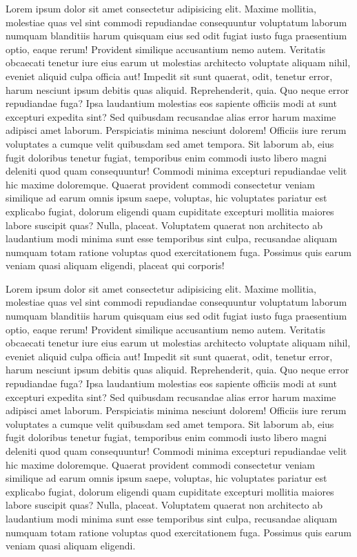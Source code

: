 \documentclass[autowc]{CUP-JNL-PPS}
\begin{document}
Lorem ipsum dolor sit amet consectetur adipisicing elit. Maxime mollitia,
molestiae quas vel sint commodi repudiandae consequuntur voluptatum laborum
numquam blanditiis harum quisquam eius sed odit fugiat iusto fuga praesentium
optio, eaque rerum! Provident similique accusantium nemo autem. Veritatis
obcaecati tenetur iure eius earum ut molestias architecto voluptate aliquam
nihil, eveniet aliquid culpa officia aut! Impedit sit sunt quaerat, odit,
tenetur error, harum nesciunt ipsum debitis quas aliquid. Reprehenderit,
quia. Quo neque error repudiandae fuga? Ipsa laudantium molestias eos
sapiente officiis modi at sunt excepturi expedita sint? Sed quibusdam
recusandae alias error harum maxime adipisci amet laborum. Perspiciatis
minima nesciunt dolorem! Officiis iure rerum voluptates a cumque velit
quibusdam sed amet tempora. Sit laborum ab, eius fugit doloribus tenetur
fugiat, temporibus enim commodi iusto libero magni deleniti quod quam
consequuntur! Commodi minima excepturi repudiandae velit hic maxime
doloremque. Quaerat provident commodi consectetur veniam similique ad
earum omnis ipsum saepe, voluptas, hic voluptates pariatur est explicabo
fugiat, dolorum eligendi quam cupiditate excepturi mollitia maiores labore
suscipit quas? Nulla, placeat. Voluptatem quaerat non architecto ab laudantium
modi minima sunt esse temporibus sint culpa, recusandae aliquam numquam
totam ratione voluptas quod exercitationem fuga. Possimus quis earum veniam
quasi aliquam eligendi, placeat qui corporis!

Lorem ipsum dolor sit amet consectetur adipisicing elit. Maxime mollitia,
molestiae quas vel sint commodi repudiandae consequuntur voluptatum laborum
numquam blanditiis harum quisquam eius sed odit fugiat iusto fuga praesentium
optio, eaque rerum! Provident similique accusantium nemo autem. Veritatis
obcaecati tenetur iure eius earum ut molestias architecto voluptate aliquam
nihil, eveniet aliquid culpa officia aut! Impedit sit sunt quaerat, odit,
tenetur error, harum nesciunt ipsum debitis quas aliquid. Reprehenderit,
quia. Quo neque error repudiandae fuga? Ipsa laudantium molestias eos
sapiente officiis modi at sunt excepturi expedita sint? Sed quibusdam
recusandae alias error harum maxime adipisci amet laborum. Perspiciatis
minima nesciunt dolorem! Officiis iure rerum voluptates a cumque velit
quibusdam sed amet tempora. Sit laborum ab, eius fugit doloribus tenetur
fugiat, temporibus enim commodi iusto libero magni deleniti quod quam
consequuntur! Commodi minima excepturi repudiandae velit hic maxime
doloremque. Quaerat provident commodi consectetur veniam similique ad
earum omnis ipsum saepe, voluptas, hic voluptates pariatur est explicabo
fugiat, dolorum eligendi quam cupiditate excepturi mollitia maiores labore
suscipit quas? Nulla, placeat. Voluptatem quaerat non architecto ab laudantium
modi minima sunt esse temporibus sint culpa, recusandae aliquam numquam
totam ratione voluptas quod exercitationem fuga. Possimus quis earum veniam
quasi aliquam eligendi.
\end{document}
